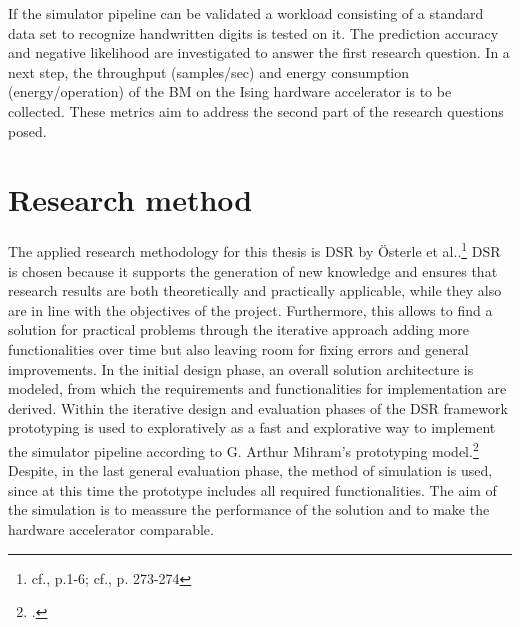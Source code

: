 If the simulator pipeline can be validated a workload consisting of a standard data set
to recognize handwritten digits is tested on it.
The prediction accuracy and negative likelihood are investigated to answer the first research question.
In a next step, the throughput (samples/sec) and energy consumption (energy/operation) of the \ac{BM} on the Ising hardware accelerator is to be collected.
These metrics aim to address the second part of the research questions posed.

\section{Research method}

The applied research methodology for this thesis is \ac{DSR} by Österle et al..\footnote{cf.\cite{oesterleMemorandumZurGestaltungsorientierten2010}, p.1-6; cf.\cite{oesterleKonsortialforschung2010}, p. 273-274}
\ac{DSR} is chosen because it supports the generation of new knowledge and ensures that research results are both theoretically and practically
applicable, while they also are in line with the objectives of the project.
Furthermore, this allows to find a solution for practical problems through the iterative approach adding more functionalities over time but also leaving room for fixing errors and general improvements.
In the initial design phase, an overall solution architecture is modeled, from which the requirements and functionalities for implementation are derived.
Within the iterative design and evaluation phases of the \ac{DSR} framework prototyping is used to exploratively as a fast and explorative way to implement the simulator pipeline according to G. Arthur Mihram's prototyping model.\footcite[cf.][71-72]{mihramSimulationMethodology1976}
Despite, in the last general evaluation phase, the method of simulation is used, since at this time the prototype includes all required functionalities.
The aim of the simulation is to meassure the performance of the solution and to make the hardware accelerator comparable. 


